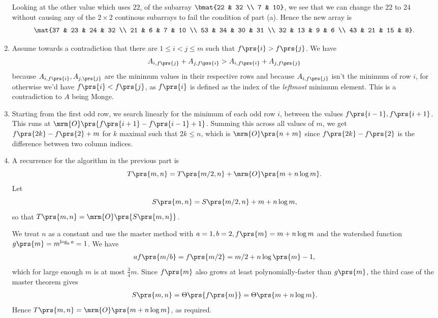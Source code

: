\documentclass[oneside]{scrbook}
\theoremstyle{definition}
\begin{document}
\begin{problem}
\begin{enumerate}[label=\alph*.]
Looking at the other value which uses $22$, of the subarray $\bmat{22 & 32 \\ 7 & 10}$, we see that we can change the $22$ to $24$ without causing any of the $2 \times 2$ continous subarrays to fail the condition of part (a).
Hence the new array is
\[\mat{37 & 23 & 24 & 32 \\ 21 & 6 & 7 & 10 \\ 53 & 34 & 30 & 31 \\ 32 & 13 & 9 & 6 \\ 43 & 21 & 15 & 8} \text{.}\]
\item %
Assume towards a contradiction that there are $1 \leq i < j \leq m$ such that $f\prs{i} > f\prs{j}$. We have
\begin{align*}
A_{i,f\prs{j}} + A_{j,f\prs{i}} > A_{i, f\prs{i}} + A_{j,f\prs{j}}
\end{align*}
because $A_{i, f\prs{i}}, A_{j,\prs{j}}$ are the minimum values in their respective rows and because $A_{i, f\prs{j}}$ isn't the minimum of row $i$, for otherwise we'd have $f\prs{i} < f\prs{j}$, as $f\prs{i}$ is defined as the index of the \emph{leftmost} minimum element.
This is a contradiction to $A$ being Monge.
\item %
Starting from the first odd row, we search linearly for the minimum of each odd row $i$, between the values $f\prs{i-1}, f\prs{i+1}$. This runs at $\mrm{O}\prs{f\prs{i+1} - f\prs{i-1} + 1}$. Summing this across all values of $m$, we get $f\prs{2k} - f\prs{2} + m$ for $k$ maximal such that $2k \leq n$, which is $\mrm{O}\prs{n + m}$ since $f\prs{2k} - f\prs{2}$ is the difference between two column indices. 
\item %
A recurrence for the algorithm in the previous part is
\[T\prs{m,n} = T\prs{m/2, n} + \mrm{O}\prs{m + n \log m} \text{.}\]
Let
\[S\prs{m,n} = S\prs{m/2, n} + m + n \log m \text{,}\]
so that $T\prs{m,n} = \mrm{O}\prs{S\prs{m,n}}$.

We treat $n$ as a constant and use the master method with $a=1, b=2, f\prs{m} = m + n \log m$ and the watershed function $g\prs{m} = m^{\log_b a} = 1$. We have
\begin{align*}
a f\prs{m/b} = f\prs{m/2} = m/2 + n \log\prs{m} - 1 \text{,}
\end{align*}
which for large enough $m$ is at most $\frac{3}{4} m$. Since $f\prs{m}$ also grows at least polynomially-faster than $g\prs{m}$, the third case of the master theorem gives
\begin{align*}
S\prs{m,n} = \Theta\prs{f\prs{m}} = \Theta\prs{m + n \log m} \text{.}
\end{align*}
Hence $T\prs{m,n} = \mrm{O}\prs{m + n \log m}$, as required.
\end{enumerate}
\end{problem}
\end{document}
